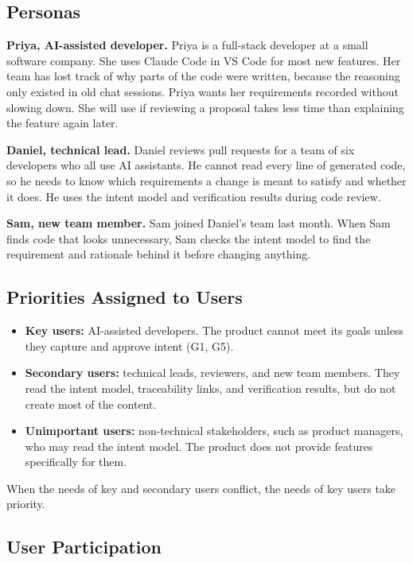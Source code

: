 \documentclass[12pt]{article}
\begin{document}
\subsection{Personas}

\textbf{Priya, AI-assisted developer.} Priya is a full-stack developer at a
small software company. She uses Claude Code in VS Code for most new features.
Her team has lost track of why parts of the code were written, because the
reasoning only existed in old chat sessions. Priya wants her requirements
recorded without slowing down. She will use \progname{} if reviewing a proposal
takes less time than explaining the feature again later.

\textbf{Daniel, technical lead.} Daniel reviews pull requests for a team of six
developers who all use AI assistants. He cannot read every line of generated
code, so he needs to know which requirements a change is meant to satisfy and
whether it does. He uses the intent model and verification results during code
review.

\textbf{Sam, new team member.} Sam joined Daniel's team last month. When Sam
finds code that looks unnecessary, Sam checks the intent model to find the
requirement and rationale behind it before changing anything.

\subsection{Priorities Assigned to Users}

\begin{itemize}
  \item \textbf{Key users:} AI-assisted developers. The product cannot meet its
  goals unless they capture and approve intent (G1, G5).
  \item \textbf{Secondary users:} technical leads, reviewers, and new team
  members. They read the intent model, traceability links, and verification
  results, but do not create most of the content.
  \item \textbf{Unimportant users:} non-technical stakeholders, such as product
  managers, who may read the intent model. The product does not provide
  features specifically for them.
\end{itemize}

When the needs of key and secondary users conflict, the needs of key users take
priority.

\subsection{User Participation}
\end{document}
